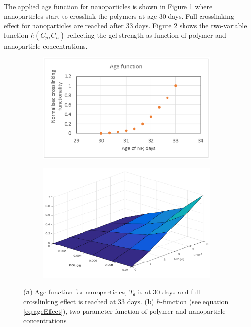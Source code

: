 \documentclass[nanomaterials,article,submit,moreauthors,pdftex]{Definitions/mdpi}
\begin{document}
The applied age function for nanoparticles is shown in Figure \ref{cht:ageFunc} where nanoparticles start to crosslink the polymers at age 30 days. Full crosslinking effect for nanoparticles are reached after 33 days. Figure \ref{cht:hFunc} shows the two-variable function $h(C_p,C_n)$  reflecting the gel strength as function of polymer and nanoparticle concentrations.      

\begin{figure}[h!] %
    \centering
    \begin{subfigure}[b]{.49\textwidth}
    \includegraphics[width=\textwidth]{fig/ageFunc.png}
    \caption{}
    \label{cht:ageFunc}
    \end{subfigure}
    \begin{subfigure}[b]{.49\textwidth}
    \includegraphics[width=\textwidth]{fig/hFunc.png}
    \caption{}
    \label{cht:hFunc}
    \end{subfigure}
    
    \caption{(\textbf{a}) Age function for nanoparticles, $T_0$ is at 30 days and full crosslinking effect is reached at 33 days. (\textbf{b}) $h$-function (see equation \ref{eq:ageEffect}), two parameter function of polymer and nanoparticle concentrations. }
    \label{cht:ageAndH}
\end{figure}
\end{document}
